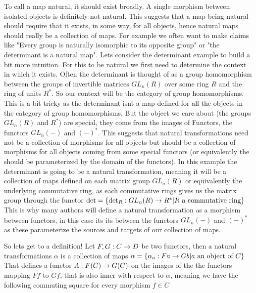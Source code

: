 \documentclass[12pt]{amsart}
\begin{document}
To call a map natural, it should exist broadly. A single morphism between isolated objects is definitely not natural.
This suggests that a map being natural should require that it exists, in some way, for all objects, hence natural maps should really be a collection of maps.
For example we often want to make claims like "Every group is naturally isomorphic to its opposite group" or "the determinant is a natural map".
Lets consider the determinant example to build a bit more intuition. For this to be natural we first need to determine the context in which it exists. 
Often the determinant is thought of as a group homomorphism between the groups of invertible matrices $GL_n(R)$ over some ring $R$ and the ring of units $R^*$.
So our context will be the category of group homomorphisms.
This is a bit tricky as the determinant isnt a map defined for all the objects in the category of group homomorphisms. 
But the object we care about (the groups $GL_n(R)$ and $R^*$) 
are special, they come from the images of Functors, the functors $GL_n(-)$ and $(-)^*$. This suggests that natural transformations need not be a collection of morphisms 
for all objects but should be a collection of morphisms for
all objects coming from some special functors (or equivalently the should be parameterized by the domain of the functors). 
In this example the determinant is going to be a natural transformation, meaning it will be a collection of maps defined on each
matrix group $GL_n(R)$ or equivalently the underlying commutative ring, as each commutative rings gives us the matrix group through the functor
$\det = \{\det_R:GL_n(R)\rightarrow R^* | R\text{ a commutative ring}\}$
This is why many authors will define a natural transformation as a morphism between functors, in this case its its between the functors $GL_n(-)$ and $(-)^*$
as these parameterize the sources and targets of our collection of maps.

So lets get to a definition!
Let $F,G:C\rightarrow D$ be two functors, then a natural transformations $\alpha$ is a collection of maps $\alpha=\{\alpha_a:Fa\rightarrow Gb | a\text{ an object of }C\}$
That defines a functor $A:F(C)\rightarrow G(C)$ on the images of the the functors mapping $Ff$ to $Gf$, that is also inner with respect to $\alpha$, 
meaning we have the following commuting square for every morphism $f\in C$
\begin{center}
\end{center}
\end{document}
